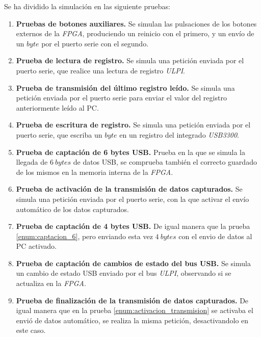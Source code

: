Se ha dividido la simulación en las siguiente pruebas:
\begin{enumerate}
    \item \textbf{Pruebas de botones auxiliares.}
    Se simulan las pulsaciones de los botones externos de la \emph{FPGA}, produciendo un reinicio con el primero, y un envío de un $byte$ por el puerto serie con el segundo.

    \item \textbf{Prueba de lectura de registro.}
    Se simula una petición enviada por el puerto serie, que realice una lectura de registro \emph{ULPI}.
    
    \item \textbf{Prueba de transmisión del último registro leído.}
    Se simula una petición enviada por el puerto serie para enviar el valor del registro anteriormente leído al PC.
    
    \item \textbf{Prueba de escritura de registro.}
    Se simula una petición enviada por el puerto serie, que escriba un $byte$ en un registro del integrado \emph{USB3300}.
    
    \item \textbf{Prueba de captación de 6 bytes  USB.}{\label{enum:captacion_6}}
    Prueba en la que se simula la llegada de $6~bytes$ de datos USB, se comprueba también el correcto guardado de los mismos en la memoria interna de la \emph{FPGA}.
    
    \item \textbf{Prueba de activación de la transmisión de datos capturados.}{\label{enum:activacion_transmision}}
    Se simula una petición enviada por el puerto serie, con la que activar el envío automático de los datos capturados.
    
    \item \textbf{Prueba de captación de 4 bytes USB.}
    De igual manera que la prueba \ref{enum:captacion_6}, pero enviando esta vez $4~bytes$ con el envio de datos al PC activado.
    
    \item \textbf{Prueba de captación de cambios de estado del bus USB.}
    Se simula un cambio de estado USB enviado por el bus \emph{ULPI}, observando si se actualiza en la \emph{FPGA}.
    
    \item \textbf{Prueba de finalización de la transmisión de datos capturados.}
    De igual manera que en la prueba \ref{enum:activacion_transmision} se activaba el envió de datos automático, se realiza la misma petición, desactivandolo en este caso.
\end{enumerate}


